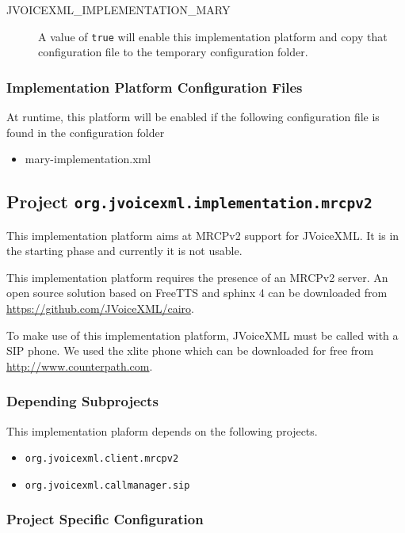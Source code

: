 \documentclass[11pt,a4paper]{article}
\begin{document}
\begin{description}
\item[JVOICEXML\_IMPLEMENTATION\_MARY] A value of \texttt{true} will enable this implementation
platform and copy that configuration file to the temporary configuration folder.
\end{description}

\subsubsection{Implementation Platform Configuration Files}

At runtime, this platform will be enabled if the following configuration file is found in the configuration
folder
\begin{itemize}
\item mary-implementation.xml
\end{itemize}


\subsection{Project \texttt{org.jvoicexml.implementation.mrcpv2}}

This implementation platform aims at MRCPv2 support for JVoiceXML. It is in the
starting phase and currently it is not usable.

This implementation platform requires the presence of an MRCPv2 server. An open
source solution based on FreeTTS and sphinx 4 can be downloaded from
\url{https://github.com/JVoiceXML/cairo}.

To make use of this implementation platform, JVoiceXML must be called with a SIP
phone. We used the xlite phone which can be downloaded for free from
\url{http://www.counterpath.com}.

\subsubsection{Depending Subprojects}

This implementation plaform depends on the following projects.
\begin{itemize}
\item \texttt{org.jvoicexml.client.mrcpv2}
\item \texttt{org.jvoicexml.callmanager.sip}
\end{itemize}

\subsubsection{Project Specific Configuration}
\end{document}
